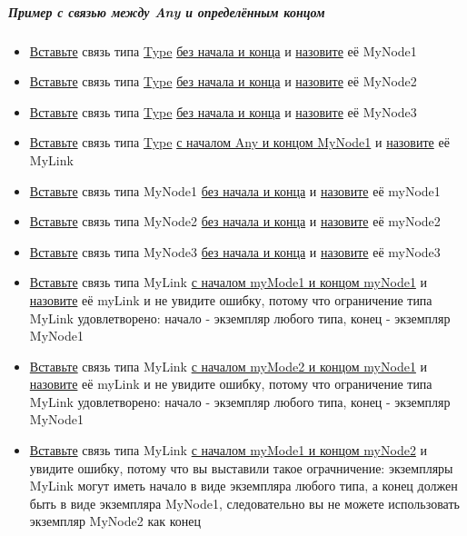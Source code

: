 \documentclass{article}
\begin{document}
\subparagraph{Пример с связью между Any и определённым концом}
\begin{itemize}
  \item \hyperlink{DeepCase.InsertLink.Def}{Вставьте} связь типа \hyperlink{type.Def}{Type} \hyperlink{FAQ.HowToInsertLinkWithoutFromAndTo}{без начала и конца} и \hyperlink{FAQ.HowToSetName}{назовите} её MyNode1
  \item \hyperlink{DeepCase.InsertLink.Def}{Вставьте} связь типа \hyperlink{type.Def}{Type} \hyperlink{FAQ.HowToInsertLinkWithoutFromAndTo}{без начала и конца} и \hyperlink{FAQ.HowToSetName}{назовите} её MyNode2
  \item \hyperlink{DeepCase.InsertLink.Def}{Вставьте} связь типа \hyperlink{type.Def}{Type} \hyperlink{FAQ.HowToInsertLinkWithoutFromAndTo}{без начала и конца} и \hyperlink{FAQ.HowToSetName}{назовите} её MyNode3
  \item \hyperlink{DeepCase.InsertLink.Def}{Вставьте} связь типа \hyperlink{type.Def}{Type} \hyperlink{FAQ.HowToInsertLinkWithFromAndTo}{с началом Any и концом MyNode1} и \hyperlink{FAQ.HowToSetName}{назовите} её MyLink
  \item \hyperlink{DeepCase.InsertLink.Def}{Вставьте} связь типа MyNode1 \hyperlink{FAQ.HowToInsertLinkWithoutFromAndTo}{без начала и конца} и \hyperlink{FAQ.HowToSetName}{назовите} её myNode1
  \item \hyperlink{DeepCase.InsertLink.Def}{Вставьте} связь типа MyNode2 \hyperlink{FAQ.HowToInsertLinkWithoutFromAndTo}{без начала и конца} и \hyperlink{FAQ.HowToSetName}{назовите} её myNode2
  \item \hyperlink{DeepCase.InsertLink.Def}{Вставьте} связь типа MyNode3 \hyperlink{FAQ.HowToInsertLinkWithoutFromAndTo}{без начала и конца} и \hyperlink{FAQ.HowToSetName}{назовите} её myNode3
  \item \hyperlink{DeepCase.InsertLink.Def}{Вставьте} связь типа MyLink \hyperlink{FAQ.HowToInsertLinkWithFromAndTo}{с началом myMode1 и концом myNode1} и \hyperlink{FAQ.HowToSetName}{назовите} её myLink и не увидите ошибку, потому что ограничение типа MyLink удовлетворено: начало - экземпляр любого типа, конец - экземпляр MyNode1
  \item \hyperlink{DeepCase.InsertLink.Def}{Вставьте} связь типа MyLink \hyperlink{FAQ.HowToInsertLinkWithFromAndTo}{с началом myMode2 и концом myNode1} и \hyperlink{FAQ.HowToSetName}{назовите} её myLink и не увидите ошибку, потому что ограничение типа MyLink удовлетворено: начало - экземпляр любого типа, конец - экземпляр MyNode1
  \item \hyperlink{DeepCase.InsertLink.Def}{Вставьте} связь типа MyLink \hyperlink{FAQ.HowToInsertLinkWithFromAndTo}{с началом myMode1 и концом myNode2} и увидите ошибку, потому что вы выставили такое ограчничение: экземпляры MyLink могут иметь начало в виде экземпляра любого типа, а конец должен быть в виде экземпляра MyNode1, следовательно вы не можете использовать экземпляр MyNode2 как конец
\end{itemize}
\end{document}
